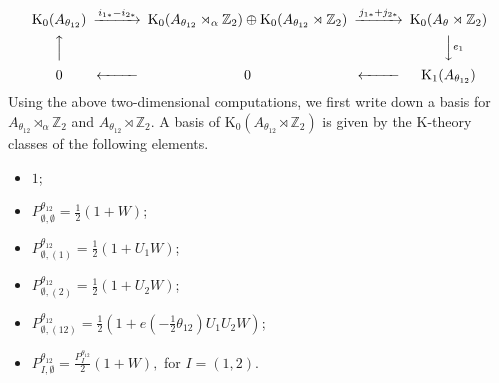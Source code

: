 \documentclass[9pt, BCOR=2mm]{amsart}
\numberwithin{equation}{section}
\numberwithin{equation}{section}
\newcommand{\Z}{{\mathbb{Z}}}
\newcommand{\K}{\mathrm{K}} %
\begin{document}
{\[
\begin{CD}
\K_0 (A_{\theta_{12}}) @>{i_{1*}-i_{2*}}>>\K_0 (A_{\theta_{12}}\rtimes_\alpha  \Z_2)\oplus \K_0 (A_{\theta_{12}}\rtimes\Z_2)@>{j_{1*}+j_{2*}}>> \K_0 (A_{\theta}\rtimes \Z_2)   \\
@A{}AA & &  @VV{e_1}V            \\
 0 @<<{}<  0 @<<{}< \K_1 (A_{\theta_{12}})
\end{CD}
\]} 
Using the above two-dimensional computations, we first write down a basis for $A_{\theta_{12}}\rtimes_\alpha  \Z_2$ and $A_{\theta_{12}}\rtimes \Z_2.$ A basis of $\K_0(A_{\theta_{12}}\rtimes \Z_2)$ is given by the K-theory classes of the following elements.
 \begin{itemize}
 \item $1$;
 \item  $P^{\theta_{12}}_{\emptyset,\emptyset} = \frac{1}{2} (1+W)$;
 \item $P^{\theta_{12}}_{\emptyset,(1)}= \frac{1}{2} (1+U_1W)$;
 \item $P^{\theta_{12}}_{\emptyset,(2)}= \frac{1}{2} (1+U_2W)$;
 \item $P^{\theta_{12}}_{\emptyset,(12)}= \frac{1}{2} (1+e( -\frac{1}{2} {\theta_{12}})U_1U_2W)$;
 \item $P^{\theta_{12}}_{I,\emptyset}=\frac{P^{\theta_{12}}_{I}}{2}(1+W),$ for $I=(1,2).$  
 	\end{itemize}
\end{document}
